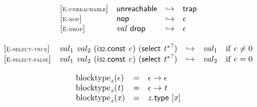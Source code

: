 \vspace{1ex}

\vspace{1ex}

$$
\begin{array}{@{}l@{}lcl@{}l@{}}
{[\textsc{\scriptsize E{-}unreachable}]} \quad & \mathsf{unreachable} &\hookrightarrow& \mathsf{trap} &  \\
{[\textsc{\scriptsize E{-}nop}]} \quad & \mathsf{nop} &\hookrightarrow& \epsilon &  \\
{[\textsc{\scriptsize E{-}drop}]} \quad & {\mathit{val}}~\mathsf{drop} &\hookrightarrow& \epsilon &  \\
\end{array}
$$

\vspace{1ex}

$$
\begin{array}{@{}l@{}lcl@{}l@{}}
{[\textsc{\scriptsize E{-}select{-}true}]} \quad & {\mathit{val}}_{{1}}~{\mathit{val}}_{{2}}~(\mathsf{i{\scriptstyle32}}.\mathsf{const}~{\mathit{c}})~(\mathsf{select}~{{{\mathit{t}}^\ast}^?}) &\hookrightarrow& {\mathit{val}}_{{1}} &\quad
  \mbox{if}~{\mathit{c}} \neq 0 \\
{[\textsc{\scriptsize E{-}select{-}false}]} \quad & {\mathit{val}}_{{1}}~{\mathit{val}}_{{2}}~(\mathsf{i{\scriptstyle32}}.\mathsf{const}~{\mathit{c}})~(\mathsf{select}~{{{\mathit{t}}^\ast}^?}) &\hookrightarrow& {\mathit{val}}_{{2}} &\quad
  \mbox{if}~{\mathit{c}} = 0 \\
\end{array}
$$

\vspace{1ex}

$$
\begin{array}{@{}lcl@{}l@{}}
{{\mathrm{blocktype}}}_{{\mathit{z}}}(\epsilon) &=& \epsilon \rightarrow \epsilon &  \\
{{\mathrm{blocktype}}}_{{\mathit{z}}}({\mathit{t}}) &=& \epsilon \rightarrow {\mathit{t}} &  \\
{{\mathrm{blocktype}}}_{{\mathit{z}}}({\mathit{x}}) &=& {\mathit{z}}.\mathsf{type}~{}[{\mathit{x}}] &  \\
\end{array}
$$

